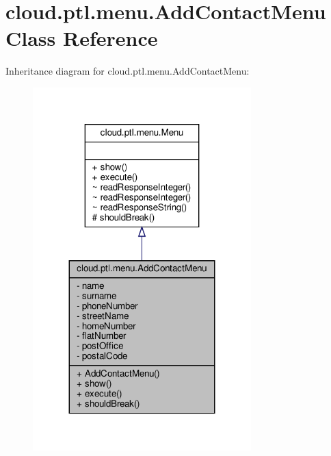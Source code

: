 \hypertarget{classcloud_1_1ptl_1_1menu_1_1AddContactMenu}{}\section{cloud.\+ptl.\+menu.\+Add\+Contact\+Menu Class Reference}
\label{classcloud_1_1ptl_1_1menu_1_1AddContactMenu}


Inheritance diagram for cloud.\+ptl.\+menu.\+Add\+Contact\+Menu\+:
\nopagebreak
\begin{figure}[H]
\begin{center}
\leavevmode
\includegraphics[width=239pt]{classcloud_1_1ptl_1_1menu_1_1AddContactMenu__inherit__graph}
\end{center}
\end{figure}


